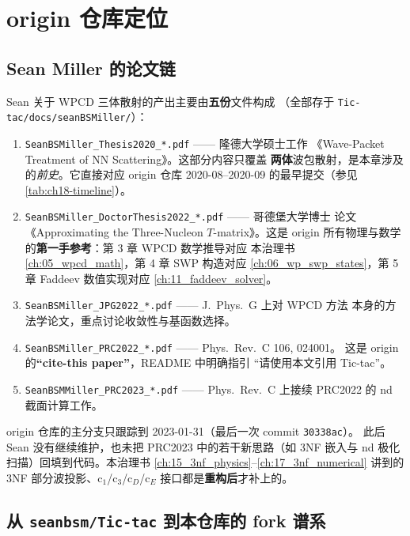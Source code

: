 \section{origin 仓库定位}
\label{sec:ch18-positioning}

\subsection{Sean Miller 的论文链}
\label{subsec:ch18-paper-chain}

Sean 关于 WPCD 三体散射的产出主要由\textbf{五份}文件构成
（全部存于 \texttt{Tic-tac/docs/seanBSMiller/}）：
\begin{enumerate}
  \item \texttt{SeanBSMiller\_Thesis2020\_*.pdf} —— 隆德大学硕士工作
        《Wave-Packet Treatment of NN Scattering》。这部分内容只覆盖
        \textbf{两体}波包散射，是本章涉及的\emph{前史}。它直接对应
        origin 仓库 2020-08--2020-09 的最早提交（参见
        \cref{tab:ch18-timeline}）。
  \item \texttt{SeanBSMiller\_DoctorThesis2022\_*.pdf} —— 哥德堡大学博士
        论文《Approximating the Three-Nucleon $T$-matrix》。这是 origin
        所有物理与数学的\textbf{第一手参考}：第 3 章 WPCD 数学推导对应
        本治理书 \cref{ch:05_wpcd_math}，第 4 章 SWP 构造对应
        \cref{ch:06_wp_swp_states}，第 5 章 Faddeev 数值实现对应
        \cref{ch:11_faddeev_solver}。
  \item \texttt{SeanBSMiller\_JPG2022\_*.pdf} —— J.~Phys.~G 上对 WPCD 方法
        本身的方法学论文，重点讨论收敛性与基函数选择。
  \item \texttt{SeanBSMiller\_PRC2022\_*.pdf} —— Phys.~Rev.~C 106, 024001。
        这是 origin 的\textbf{“cite-this paper”}，README 中明确指引
        “请使用本文引用 Tic-tac”。
  \item \texttt{SeanBSMMiller\_PRC2023\_*.pdf} —— Phys.~Rev.~C 上接续 PRC2022
        的 nd 截面计算工作。
\end{enumerate}

origin 仓库的主分支只跟踪到 2023-01-31（最后一次 commit \texttt{30338ac}）。
此后 Sean 没有继续维护，也未把 PRC2023 中的若干新思路（如 3NF 嵌入与 nd
极化扫描）回填到代码。本治理书 \cref{ch:15_3nf_physics}--\cref{ch:17_3nf_numerical}
讲到的 3NF 部分波投影、c$_1$/c$_3$/c$_D$/c$_E$ 接口都是\textbf{重构后}才补上的。

\subsection{从 \texttt{seanbsm/Tic-tac} 到本仓库的 fork 谱系}

